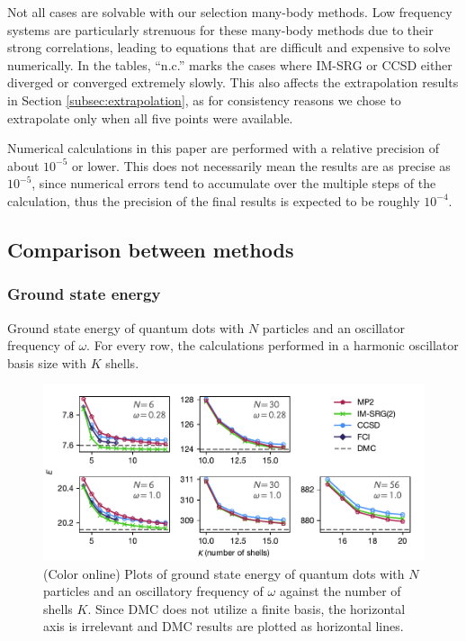 Not all cases are solvable with our selection many-body methods.  Low frequency systems are particularly strenuous for these many-body methods due to their strong correlations, leading to equations that are difficult and expensive to solve numerically.  In the tables, ``n.c.'' marks the cases where IM-SRG or CCSD either diverged or converged extremely slowly.  This also affects the extrapolation results in Section \ref{subsec:extrapolation}, as for consistency reasons we chose to extrapolate only when all five points were available.

Numerical calculations in this paper are performed with a relative precision of about $10^{-5}$ or lower.  This does not necessarily mean the results are as precise as $10^{-5}$, since numerical errors tend to accumulate over the multiple steps of the calculation, thus the precision of the final results is expected to be roughly $10^{-4}$.

\subsection{Comparison between methods}

\subsubsection{Ground state energy}

\begin{table}
  \centering
  \caption{Ground state energy of quantum dots with $N$ particles and an oscillator frequency of $\omega$.  For every row, the calculations performed in a harmonic oscillator basis size with $K$ shells.}
  \label{tab:ground}
  
\end{table}

\begin{figure}
  \centering
  \includegraphics{fig-gs2.pdf}
  \caption{(Color online) Plots of ground state energy of quantum dots with $N$ particles and an oscillatory frequency of $\omega$ against the number of shells $K$.  Since DMC does not utilize a finite basis, the horizontal axis is irrelevant and DMC results are plotted as horizontal lines.}
  \label{fig:gs}
\end{figure}

